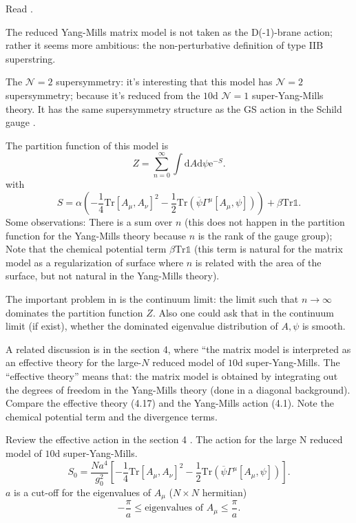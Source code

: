\newpage
Read .

The reduced Yang-Mills matrix model is not taken as the D(-1)-brane action;
rather it seems more ambitious: the non-perturbative definition of type IIB superstring.

The $\mathcal{N}=2$ supersymmetry:
it's interesting that this model has $\mathcal{N}=2$ supersymmetry;
because it's reduced from the $10\mathrm{d}$ $\mathcal{N}=1$
super-Yang-Mills theory.
It has the same supersymmetry structure as the
GS action in the Schild gauge .

The partition function of this model is
\begin{equation}
	Z = \sum_{n=0}^\infty \int \mathrm{d}A \mathrm{d}\psi \mathrm{e}^{-S}.
\end{equation}
with
\begin{equation}
	S = \alpha \left( -\frac{1}{4} \mathrm{Tr}[A_\mu,A_\nu]^2
	-\frac{1}{2} \mathrm{Tr}(\overline{\psi}\Gamma^\mu [A_\mu,\psi])\right) 
	+\beta \mathrm{Tr}\mathds{1}.
\end{equation}
Some observations:
There is a sum over $n$
(this does not happen in the partition function for the Yang-Mills theory
because $n$ is the rank of the gauge group);
Note that the chemical potential term $\beta \mathrm{Tr}\mathds{1}$
(this term is natural for the matrix model as a regularization of surface
where $n$ is related with the area of the surface,
but not natural in the Yang-Mills theory).

The important problem in  is the continuum limit:
the limit such that $n\to\infty$ dominates the partition function $Z$.
Also one could ask that in the continuum limit (if exist),
whether the dominated eigenvalue distribution of $A,\psi$ is smooth.

A related discussion is in the section 4,
where ``the matrix model is interpreted as an effective theory for the large-$N$ reduced model of $10\mathrm{d}$ super-Yang-Mills.
The ``effective theory'' means that:
the matrix model is obtained by integrating out the degrees of freedom in the Yang-Mills theory (done in a diagonal background).
Compare the effective theory (4.17) and the Yang-Mills action (4.1).
Note the chemical potential term and the divergence terms.

Review the effective action in the section 4 .
The action for the large N reduced model of $10\mathrm{d}$ super-Yang-Mills.
\begin{equation}
	S_0 = \frac{N a^4}{g_0^2} \left[  -\frac{1}{4} \mathrm{Tr}[A_\mu,A_\nu]^2 
	- \frac{1}{2} \mathrm{Tr}(\overline{\psi}\Gamma^\mu [A_\mu,\psi])\right] .
\end{equation}
$a$ is a cut-off for the eigenvalues of $A_\mu$ ($N\times N$ hermitian)
\[
	- \frac{\pi}{a} \leq \text{eigenvalues of } A_\mu \leq \frac{\pi}{a}
.\] 

